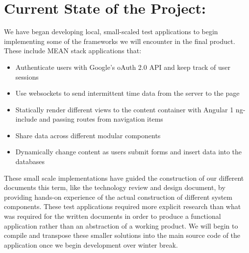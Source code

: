 \documentclass[journal,10pt,onecolumn,compsoc]{IEEEtran} \usepackage[margin=1.0in]{geometry} \usepackage{pdfpages}
\begin{document}
    \section{Current State of the Project:}
    We have began developing local, small-scaled test applications to begin implementing some of the frameworks we will encounter in the final product. These include MEAN stack applications that:
        \begin{itemize}
            \item Authenticate users with Google’s oAuth 2.0 API and keep track of user sessions
            \item Use websockets to send intermittent time data from the server to the page
            \item Statically render different views to the content container with Angular 1 ng-include and passing routes from navigation items
            \item Share data across different modular components
            \item Dynamically change content as users submit forms and insert data into the databases
        \end{itemize}

    \noindent These small scale implementations have guided the construction of our different documents this term, like the technology review and design document, by providing hands-on experience of the actual construction of different system components. These test applications required more explicit research than what was required for the written documents in order to produce a functional application rather than an abstraction of a working product. We will begin to compile and transpose these smaller solutions into the main source code of the application once we begin development over winter break.
    
    
\end{document}
